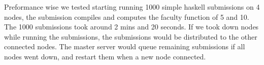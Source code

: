 Preformance wise we tested starting running 1000 simple haskell submissions on 4 nodes, the submission compiles and computes the faculty function of 5 and 10. The 1000 submissions took around 2 mins and 20 seconds. If we took down nodes while running the submissions, the submissions would be distributed to the other connected nodes. The master server would queue remaining submissions if all nodes went down, and restart them when a new node connected.
